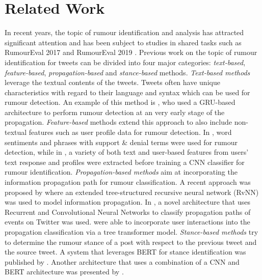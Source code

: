\documentclass[11pt,a4paper]{article}
\begin{document}
\section{Related Work}
In recent years, the topic of rumour identification and analysis has attracted significant attention and has been subject to studies in shared tasks such as RumourEval 2017 \citep{RN690} and RumourEval 2019 \citep{RN691}.  Previous work on the topic of rumour identification for tweets can be divided into four major categories: \textit{text-based},  \textit{feature-based}, \textit{propagation-based} and \textit{stance-based} methods.
\newline
\textit{Text-based methods} leverage the textual contents of the tweets. Tweets often have unique characteristics with regard to their language and syntax which can be used for rumour detection. An example of this method is \citet{RN671}, who used a GRU-based architecture to perform rumour detection at an very early stage of the propagation.
\newline
\textit{Feature-based} methods extend this approach to also include non-textual features such as user profile data for rumour detection. In \citet{RN481}, word sentiments and phrases with support \& denial terms were used for rumour detection, while in \citet{RN673}, a variety of both text and user-based features from users’ text response and profiles were extracted before training a CNN classifier for rumour identification. 
\newline
\textit{Propagation-based methods} aim at incorporating the information propagation path for rumour classification. A recent approach was proposed by \citet{RN679} where an extended tree-structured recursive neural network (RvNN) was used to model information propagation. 
In \citet{RN672}, a novel architecture that uses Recurrent and Convolutional Neural Networks to classify propagation paths of events on Twitter was used. \citet{RN669} were able to incorporate user interactions into the propagation classification via a tree transformer model.
\newline
\textit{Stance-based methods} try to determine the rumour stance of a post with respect to the previous tweet and the source tweet. A system that leverages BERT for stance identification was published by \citet{RN665}. Another architecture that uses a combination of a CNN and BERT architecture was presented by \citet{RN480}.
\end{document}
